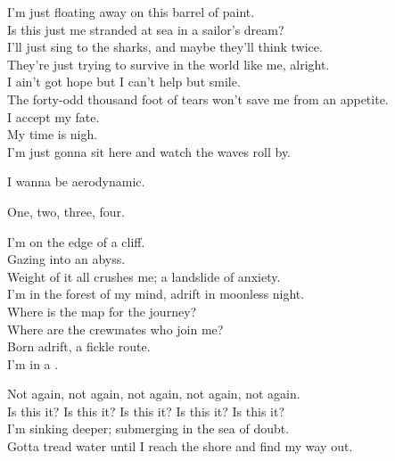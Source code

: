 
I'm just floating away on this barrel of paint. \\
Is this just me stranded at sea in a sailor's dream? \\
I'll just sing to the sharks, and maybe they'll think twice. \\
They're just trying to survive in the world like me, alright. \\
I ain't got hope but I can't help but smile. \\
The forty-odd thousand foot of tears won't save me from an appetite. \\
I accept my fate. \\
My time is nigh. \\
I'm just gonna sit here and watch the waves roll by. \\


I wanna be aerodynamic. \\





One, two, three, four. \\


I'm on the edge of a cliff. \\
Gazing into an abyss. \\
Weight of it all crushes me; a landslide of anxiety. \\
I'm in the forest of my mind, adrift in moonless night. \\
Where is the map for the journey? \\
Where are the crewmates who join me? \\
Born adrift, a fickle route. \\
I'm in a . \\


Not again, not again, not again, not again, not again. \\
Is this it? Is this it? Is this it? Is this it? Is this it? \\
I'm sinking deeper; submerging in the sea of doubt. \\
Gotta tread water until I reach the shore and find my way out. \\

